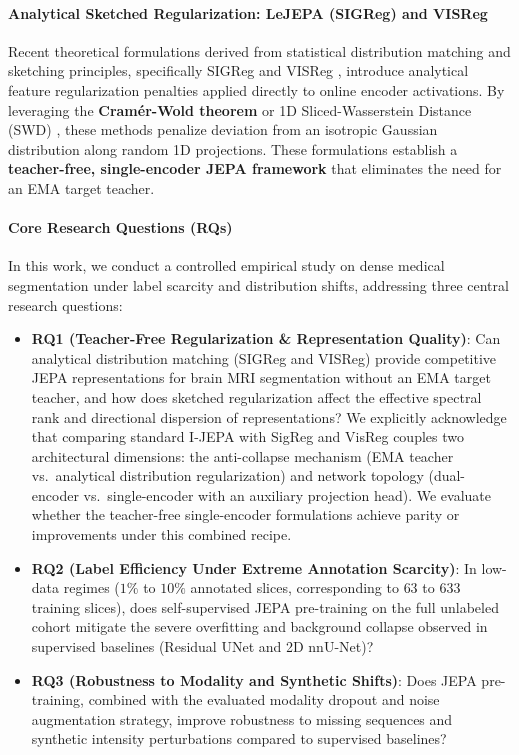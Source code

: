 \documentclass{article}
\begin{document}
\paragraph{Analytical Sketched Regularization: LeJEPA (SIGReg) and VISReg}
Recent theoretical formulations derived from statistical distribution matching and sketching principles, specifically SIGReg \citep{balestriero2025lejepa} and VISReg \citep{wu2026visreg}, introduce analytical feature regularization penalties applied directly to online encoder activations. By leveraging the \textbf{Cram\'er-Wold theorem} \citep{cramer1936theorems} or 1D Sliced-Wasserstein Distance (SWD) \citep{bonneel2015sliced,villani2009optimal}, these methods penalize deviation from an isotropic Gaussian distribution along random 1D projections. These formulations establish a \textbf{teacher-free, single-encoder JEPA framework} that eliminates the need for an EMA target teacher.

\paragraph{Core Research Questions (RQs)}
In this work, we conduct a controlled empirical study on dense medical segmentation under label scarcity and distribution shifts, addressing three central research questions:
\begin{itemize}
    \item \textbf{RQ1 (Teacher-Free Regularization \& Representation Quality)}: Can analytical distribution matching (SIGReg and VISReg) provide competitive JEPA representations for brain MRI segmentation without an EMA target teacher, and how does sketched regularization affect the effective spectral rank and directional dispersion of representations? We explicitly acknowledge that comparing standard I-JEPA with SigReg and VisReg couples two architectural dimensions: the anti-collapse mechanism (EMA teacher vs.\ analytical distribution regularization) and network topology (dual-encoder vs.\ single-encoder with an auxiliary projection head). We evaluate whether the teacher-free single-encoder formulations achieve parity or improvements under this combined recipe.
    \item \textbf{RQ2 (Label Efficiency Under Extreme Annotation Scarcity)}: In low-data regimes ($1\%$ to $10\%$ annotated slices, corresponding to $63$ to $633$ training slices), does self-supervised JEPA pre-training on the full unlabeled cohort mitigate the severe overfitting and background collapse observed in supervised baselines (Residual UNet and 2D nnU-Net)?
    \item \textbf{RQ3 (Robustness to Modality and Synthetic Shifts)}: Does JEPA pre-training, combined with the evaluated modality dropout and noise augmentation strategy, improve robustness to missing sequences and synthetic intensity perturbations compared to supervised baselines?
\end{itemize}
\end{document}
